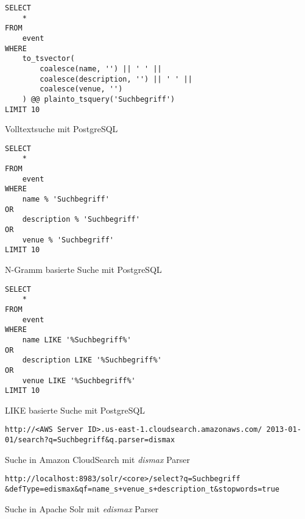 \begin{appendices}
\begin{listing}[ht]
\begin{verbatim}
SELECT
	*
FROM
	event
WHERE
	to_tsvector(
		coalesce(name, '') || ' ' ||
		coalesce(description, '') || ' ' ||
		coalesce(venue, '')
	) @@ plainto_tsquery('Suchbegriff')
LIMIT 10
\end{verbatim}
\caption{Volltextsuche mit PostgreSQL}
\label{lst:fulltext_postgresql}
\end{listing}

\begin{listing}[ht]
\begin{verbatim}
SELECT
	*
FROM
	event
WHERE
	name % 'Suchbegriff'
OR
	description % 'Suchbegriff'
OR
	venue % 'Suchbegriff'
LIMIT 10
\end{verbatim}
\caption{N-Gramm basierte Suche mit PostgreSQL}
\label{lst:ngram_postgresql}
\end{listing}

\begin{listing}[ht]
\begin{verbatim}
SELECT
	*
FROM
	event
WHERE
	name LIKE '%Suchbegriff%'
OR
	description LIKE '%Suchbegriff%'
OR
	venue LIKE '%Suchbegriff%'
LIMIT 10
\end{verbatim}
\caption{LIKE basierte Suche mit PostgreSQL}
\label{lst:ngram_postgresql_search_inappendix}
\end{listing}



\begin{listing}[ht]
\begin{verbatim}
http://<AWS Server ID>.us-east-1.cloudsearch.amazonaws.com/ 2013-01-01/search?q=Suchbegriff&q.parser=dismax
\end{verbatim}
\caption{Suche in Amazon CloudSearch mit \emph{dismax} Parser}
\label{lst:search_aws}
\end{listing}

\begin{listing}[ht]
\begin{verbatim}
http://localhost:8983/solr/<core>/select?q=Suchbegriff &defType=edismax&qf=name_s+venue_s+description_t&stopwords=true
\end{verbatim}
\caption{Suche in Apache Solr mit \emph{edismax} Parser}
\label{lst:search_solr}
\end{listing}



\end{appendices}

